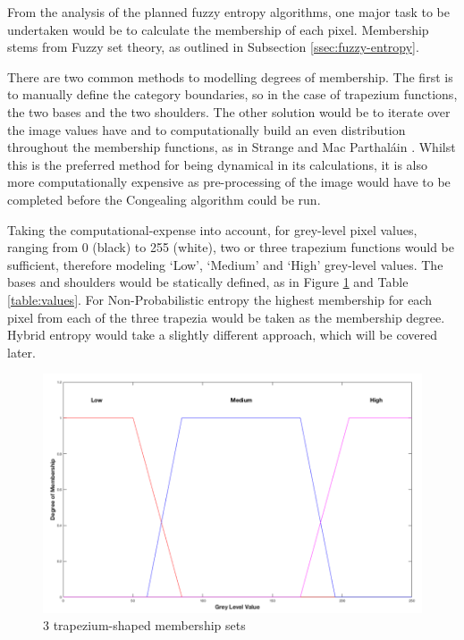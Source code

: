 From the analysis of the planned fuzzy entropy algorithms, one major task to be undertaken would be to calculate the membership of each pixel. Membership stems from Fuzzy set theory, as outlined in Subsection \ref{ssec:fuzzy-entropy}.

There are two common methods to modelling degrees of membership. The first is to manually define the category boundaries, so in the case of trapezium functions, the two bases and the two shoulders. The other solution would be to iterate over the image values have and to computationally build an even distribution throughout the membership functions, as in Strange and Mac Parthal\'ain \cite{Mac_Parthalain_Strange_2013}. Whilst this is the preferred method for being dynamical in its calculations, it is also more computationally expensive as pre-processing of the image would have to be completed before the \Gls{Congealing} algorithm could be run.

Taking the computational-expense into account, for grey-level pixel values, ranging from 0 (black) to 255 (white), two or three trapezium functions would be sufficient, therefore modeling `Low', `Medium' and `High' grey-level values. The bases and shoulders would be statically defined, as in Figure \ref{fig:3-trapeziums} and Table \ref{table:values}. For Non-Probabilistic entropy the highest membership for each pixel from each of the three trapezia would be taken as the membership degree. Hybrid entropy would take a slightly different approach, which will be covered later.

\begin{figure}[H]
  \center
  \includegraphics[scale=0.4]{Chapter2/hybrid-img/3_traps.png}
  \caption{3 trapezium-shaped membership sets}
  \label{fig:3-trapeziums}
\end{figure}


